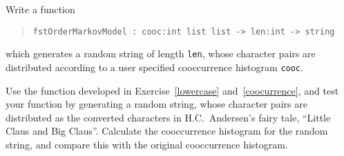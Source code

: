 Write a function
\begin{quote}
  \mbox{\lstinline!fstOrderMarkovModel : cooc:int list list -> len:int -> string!}
\end{quote}
which generates a random string of length \lstinline!len!, whose
character pairs are distributed according to a user specified
cooccurrence histogram \lstinline!cooc!.

Use the function developed in Exercise~\ref{lowercase} and~\ref{coocurrence}, and test
your function by generating a random string, whose character pairs are
distributed as the converted characters in H.C.\ Andersen's fairy
tale, ``Little Claus and Big Claus''. Calculate the cooccurrence
histogram for the random string, and compare this with the original
cooccurrence histogram.
